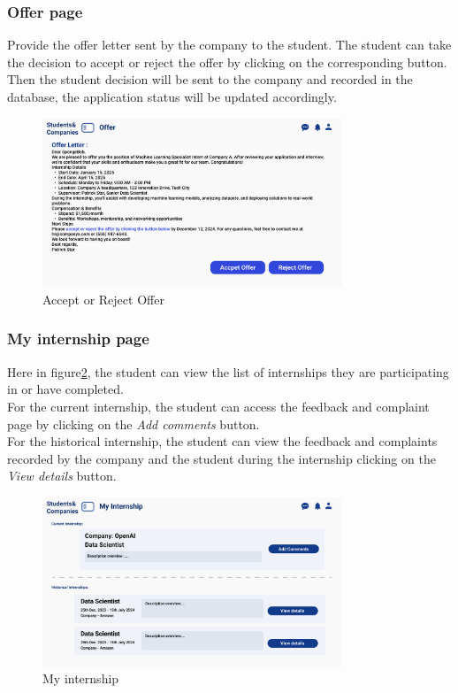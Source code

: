 \subsubsection{Offer page}
Provide the offer letter sent by the company to the student. The student can take the decision to accept or reject the offer by clicking on the corresponding button.
Then the student decision will be sent to the company and recorded in the database, the application status will be updated accordingly.
\begin{figure}[H]
    \centering
    \includegraphics[width=0.8\textwidth]{Images/UI/Reject-student.png}
    \caption{Accept or Reject Offer }\label{fig:Accept or Reject Offer}
\end{figure}
\subsubsection{My internship page}
Here in figure\ref{fig:My internship}, the student can view the list of internships they are participating in or have completed.\\
For the current internship, the student can access the feedback and complaint page by clicking on the \textit{Add comments} button. \\
For the historical internship, the student can view the feedback and complaints recorded by the company and the student during the internship clicking
on the \textit{View details} button.
\begin{figure}[H]
    \centering
    \includegraphics[width=0.8\textwidth]{Images/UI/My Internship-student.png}
    \caption{My internship }\label{fig:My internship}
\end{figure}
